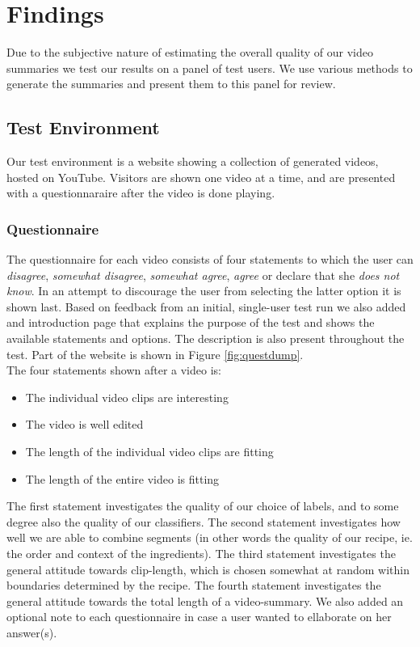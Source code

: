 %
\section{Findings}
%
Due to the subjective nature of estimating the overall quality of our video summaries we test our results on a panel of test users. We use various methods to generate the summaries and present them to this panel for review.
%
\subsection{Test Environment}
%
Our test environment is a website showing a collection of generated videos, hosted on YouTube. Visitors are shown one video at a time, and are presented with a questionnaraire after the video is done playing.
%
\subsubsection{Questionnaire}\label{sec:questionnaire}
%
%
The questionnaire for each video consists of four statements to which the user can \textit{disagree}, \textit{somewhat disagree}, \textit{somewhat agree}, \textit{agree} or declare that she \textit{does not know}. In an attempt to discourage the user from selecting the latter option it is shown last. Based on feedback from an initial, single-user test run we also added and introduction page that explains the purpose of the test and shows the available statements and options. The description is also present throughout the test. Part of the website is shown in Figure \ref{fig:questdump}.\\
%
The four statements shown after a video is:
%
\begin{itemize}
\item The individual video clips are interesting
\item The video is well edited
\item The length of the individual video clips are fitting
\item The length of the entire video is fitting
\end{itemize}
%
The first statement investigates the quality of our choice of labels, and to some degree also the quality of our classifiers. The second statement investigates how well we are able to combine segments (in other words the quality of our recipe, ie. the order and context of the ingredients). The third statement investigates the general attitude towards clip-length, which is chosen somewhat at random within boundaries determined by the recipe. The fourth statement investigates the general attitude towards the total length of a video-summary. We also added an optional note to each questionnaire in case a user wanted to ellaborate on her answer(s).
